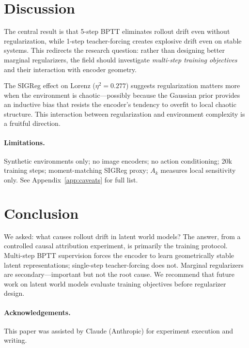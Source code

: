 \documentclass{article}
\begin{document}
\section{Discussion}

The central result is that 5-step BPTT eliminates rollout drift even without regularization,
while 1-step teacher-forcing creates explosive drift even on stable systems.
This redirects the research question: rather than designing better marginal regularizers,
the field should investigate \emph{multi-step training objectives} and their interaction with
encoder geometry.

The SIGReg effect on Lorenz ($\eta^2 = 0.277$) suggests regularization matters more when
the environment is chaotic---possibly because the Gaussian prior provides an inductive bias
that resists the encoder's tendency to overfit to local chaotic structure.
This interaction between regularization and environment complexity is a fruitful direction.

\paragraph{Limitations.}
Synthetic environments only; no image encoders; no action conditioning; 20k training steps;
moment-matching SIGReg proxy; $A_k$ measures local sensitivity only.
See Appendix~\ref{app:caveats} for full list.

\section{Conclusion}

We asked: what causes rollout drift in latent world models?
The answer, from a controlled causal attribution experiment, is primarily the training protocol.
Multi-step BPTT supervision forces the encoder to learn geometrically stable latent
representations; single-step teacher-forcing does not.
Marginal regularizers are secondary---important but not the root cause.
We recommend that future work on latent world models evaluate training objectives before
regularizer design.

\paragraph{Acknowledgements.}
This paper was assisted by Claude (Anthropic) for experiment execution and writing.



\end{document}
